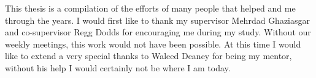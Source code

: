 

This thesis is a compilation of the efforts of many people that helped and
me through the years. I would first like to thank my supervisor Mehrdad Ghaziasgar and co-supervisor Regg Dodds for encouraging me during my study. Without our weekly meetings, this work would not have been possible. 
At this time I would like to extend a very special thanks to Waleed Deaney for being my mentor, without his help I would certainly not be where I am today.

